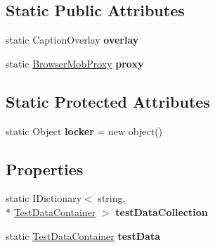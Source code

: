 \subsection*{Static Public Attributes}
\begin{DoxyCompactItemize}
\item 
static Caption\-Overlay {\bfseries overlay}
\item 
\hypertarget{class_proto_test_1_1_golem_1_1_core_1_1_test_base_a8125237d59819f5e07257a748a749924}{static \hyperlink{class_proto_test_1_1_golem_1_1_proxy_1_1_browser_mob_proxy}{Browser\-Mob\-Proxy} {\bfseries proxy}}\label{class_proto_test_1_1_golem_1_1_core_1_1_test_base_a8125237d59819f5e07257a748a749924}

\end{DoxyCompactItemize}
\subsection*{Static Protected Attributes}
\begin{DoxyCompactItemize}
\item 
\hypertarget{class_proto_test_1_1_golem_1_1_core_1_1_test_base_a9cfae135ecc5b267f69ea6ceb066a980}{static Object {\bfseries locker} = new object()}\label{class_proto_test_1_1_golem_1_1_core_1_1_test_base_a9cfae135ecc5b267f69ea6ceb066a980}

\end{DoxyCompactItemize}
\subsection*{Properties}
\begin{DoxyCompactItemize}
\item 
\hypertarget{class_proto_test_1_1_golem_1_1_core_1_1_test_base_a1f539ada84e34c722a8339b26faef95c}{static I\-Dictionary$<$ string, \\*
\hyperlink{class_proto_test_1_1_golem_1_1_core_1_1_test_data_container}{Test\-Data\-Container} $>$ {\bfseries test\-Data\-Collection}}\label{class_proto_test_1_1_golem_1_1_core_1_1_test_base_a1f539ada84e34c722a8339b26faef95c}

\item 
\hypertarget{class_proto_test_1_1_golem_1_1_core_1_1_test_base_a67003295ddddd67b5986ec580838a13a}{static \hyperlink{class_proto_test_1_1_golem_1_1_core_1_1_test_data_container}{Test\-Data\-Container} {\bfseries test\-Data}}\label{class_proto_test_1_1_golem_1_1_core_1_1_test_base_a67003295ddddd67b5986ec580838a13a}

\end{DoxyCompactItemize}
